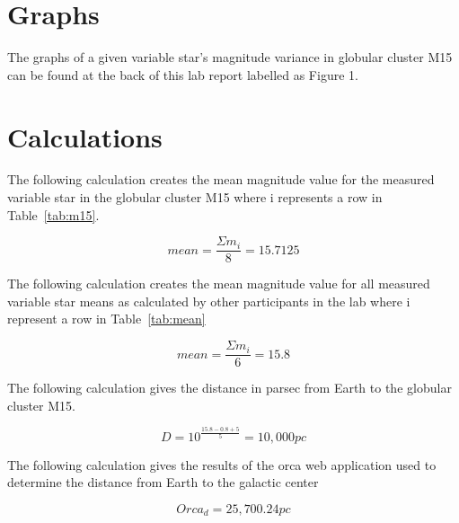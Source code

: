 \documentclass{article}
\begin{document}

\section{Graphs}

The graphs of a given variable star's magnitude variance in globular cluster M15
can be found at the back of this lab report labelled as Figure 1.


\section{Calculations}
\label{sec:calc}

The following calculation creates the mean magnitude value for the measured variable star in
the globular cluster M15 where i represents a row in Table~\ref{tab:m15}.

\begin{equation}
\label{calc:m}
mean = \frac{\Sigma m_{i}}{8} = 15.7125
\end{equation}

The following calculation creates the mean magnitude value for all measured variable star
means as calculated by other participants in the lab where i represent a row in
Table~\ref{tab:mean}

\begin{equation}
\label{calc:mm}
mean = \frac{\Sigma m_{i}}{6} = 15.8
\end{equation}

The following calculation gives the distance in parsec from Earth to the globular cluster
M15.

\begin{equation}
\label{calc:d1}
D = 10^{\frac{15.8 - 0.8 + 5}{5}} = 10,000 pc
\end{equation}

The following calculation gives the results of the orca web application used to determine
the distance from Earth to the galactic center

\begin{equation}
\label{calc:d2}
Orca_{d} = 25,700.24 pc
\end{equation}
\end{document}
